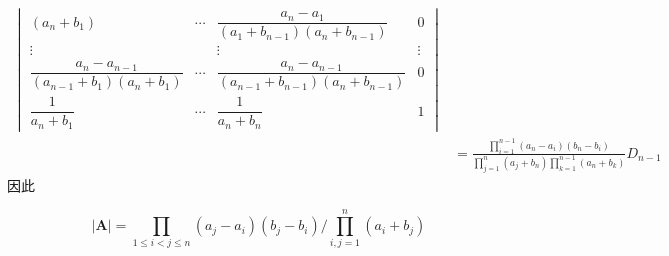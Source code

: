 {\begin{solution}
\begin{align*}
\begin{vmatrix}
{                \left(a_n+b_1\right)} & \cdots             &
                \dfrac{a_n-a_1}{\left(
                    a_1+b_{n-1}
                    \right)\left(
                    a_n+b_{n-1}
                \right)}              & 0                                    \\
                \vdots                &                    & \vdots & \vdots \\
                \dfrac{a_n-a_{n-1}}{\left(
                a_{n-1}+b_1
                \right)\left(
                a_n+b_1
                \right)}              & \cdots             &
                \dfrac{a_n-a_{n-1}}{\left(
                a_{n-1}+b_{n-1}
                \right)\left(
                a_n+b_{n-1}
                \right)}              & 0                                    \\[1em]
                \dfrac{1}{a_n+b_1}    &
                \cdots                & \dfrac{1}{a_n+b_n} & 1
            \end{vmatrix}                       \\
                & =
            \frac{
                \prod\limits_{i=1}^{n-1}
                \left(a_n-a_i\right)\left(
                b_n-b_i
                \right)
            }{\prod\limits_{j=1}^{n}
                \left(a_j+b_n\right)\prod\limits_{k=1}^{n-1}\left(
                a_n+b_k
                \right)}D_{n-1}
        \end{align*}
        因此

        \[
            \left|\bm{A}\right|
            =
            \prod_{1\leqslant i < j\leqslant n}
            \left(a_j-a_i\right)\left(
            b_j-b_i
            \right)
            \Bigg/
            \prod_{i,j=1}^{n}\left(a_i+b_j
            \right)
        \]
    \end{solution}
}
